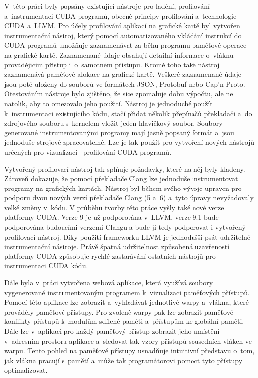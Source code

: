 V~této práci byly popsány existující nástroje pro ladění, profilování a~instrumentaci CUDA programů, obecné principy profilování a~technologie CUDA a~LLVM. Pro účely profilování aplikací na grafické kartě byl vytvořen instrumentační nástroj, který pomocí automatizovaného vkládání instrukcí do CUDA programů umožňuje zaznamenávat za běhu programu paměťové operace na grafické kartě. Zaznamenané údaje obsahují detailní informace o~vláknu provádějícím přístup i~o~samotném přístupu. Kromě toho také nástroj zaznamenává paměťové alokace na grafické kartě. Veškeré zaznamenané údaje jsou poté uloženy do souborů ve formátech JSON, Protobuf nebo Cap'n Proto. Otestováním nástroje bylo zjištěno, že sice zpomaluje dobu výpočtu, ale ne natolik, aby to omezovalo jeho použití. Nástroj je jednoduché použít k~instrumentaci existujícího kódu, stačí přidat několik přepínačů překladači a~do zdrojového souboru s~kernelem vložit jeden hlavičkový soubor. Soubory generované instrumentovanými programy mají jasně popsaný formát a~jsou jednoduše strojově zpracovatelné. Lze je tak použít pro vytvoření nových nástrojů určených pro vizualizaci ~profilování CUDA programů.

Vytvořený profilovací nástroj tak splňuje požadavky, které na něj byly kladeny. Zároveň dokazuje, že pomocí překladače Clang lze jednoduše instrumentovat programy na grafických kartách. Nástroj byl během svého vývoje upraven pro podporu dvou nových verzí překladače Clang (5 a~6) a~tyto úpravy nevyžadovaly velké změny v~kódu. V průběhu tvorby této práce vyšly také nové verze platformy CUDA. Verze 9 je už podporována v~LLVM, verze 9.1 bude podporována budoucími verzemi Clangu a bude ji tedy podporovat i vytvořený profilovací nástroj. Díky použití frameworku LLVM je jednodušší psát udržitelné instrumentační nástroje. Právě špatná udržitelnost způsobená uzavřeností platformy CUDA způsobuje rychlé zastarávání ostatních nástrojů pro instrumentaci CUDA kódu.

Dále byla v~práci vytvořena webová aplikace, která využívá soubory vygenerované instrumentovaným programem k~vizualizaci paměťových přístupů. Pomocí této aplikace lze zobrazit a~vyhledávat jednotlivé warpy a~vlákna, které prováděly paměťové přístupy. Pro zvolené warpy pak lze zobrazit paměťové konflikty přístupů k~modulům sdílené paměti a~přístupům ke globální paměti. Dále lze v~aplikaci pro každý paměťový přístup zobrazit jeho umístění v~adresním prostoru aplikace a~sledovat tak vzory přístupů sousedních vláken ve warpu. Tento pohled na paměťové přístupy usnadňuje intuitivní představu o~tom, jak vlákna pracují s~pamětí a~může tak programátorovi pomoct tyto přístupy optimalizovat.

